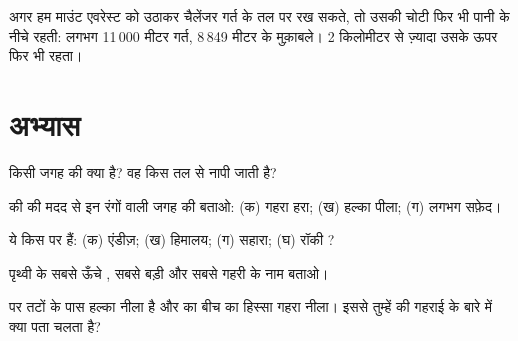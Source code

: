 \begin{example}\label{ex:g4:world-physical-map:everest-in-deep}
अगर हम माउंट एवरेस्ट को उठाकर चैलेंजर गर्त के तल पर रख सकते, तो उसकी चोटी फिर
भी पानी के नीचे रहती: लगभग 11\,000 मीटर गर्त, 8\,849 मीटर  के मुक़ाबले।
2 किलोमीटर से ज़्यादा  उसके ऊपर
फिर भी रहता।
\end{example}

\section{अभ्यास}

\begin{exercise}[$\star$]\label{exo:g4:world-physical-map:1}
किसी जगह की  क्या है? वह किस तल से नापी जाती है?
\end{exercise}

\begin{exercise}[$\star$]\label{exo:g4:world-physical-map:2}
 की  की मदद से इन रंगों वाली जगह की  बताओ:
(क) गहरा हरा; (ख) हल्का पीला; (ग) लगभग सफ़ेद।
\end{exercise}

\begin{exercise}[$\star$]\label{exo:g4:world-physical-map:3}
ये किस  पर हैं: (क) एंडीज़; (ख) हिमालय; (ग) सहारा;
(घ) रॉकी ?
\end{exercise}

\begin{exercise}[$\star$]\label{exo:g4:world-physical-map:4}
पृथ्वी के सबसे ऊँचे , सबसे बड़ी  और सबसे गहरी  के नाम बताओ।
\end{exercise}

\begin{exercise}[$\star$]\label{exo:g4:world-physical-map:5}
 पर तटों के पास  हल्का नीला है और  का बीच का हिस्सा
गहरा नीला। इससे तुम्हें  की गहराई के बारे में क्या पता चलता है?
\end{exercise}

